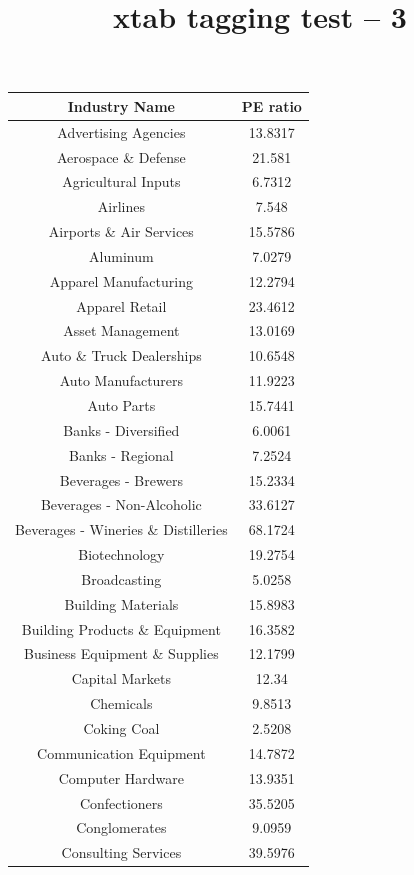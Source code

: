 \documentclass{article}
\title{xtab tagging test -- 3}
\begin{document}
\begin{xtabular}{cc}
Industry Name & PE ratio \\ \hline
Advertising Agencies & 13.8317\\\hline
Aerospace \& Defense & 21.581 \\ \hline
Agricultural Inputs & 6.7312 \\ \hline
Airlines & 7.548 \\ \hline
Airports \& Air Services & 15.5786 \\ \hline
Aluminum & 7.0279 \\ \hline
Apparel Manufacturing & 12.2794\\ \hline
Apparel Retail & 23.4612 \\ \hline
Asset Management& 13.0169\\ \hline
Auto \& Truck Dealerships& 10.6548\\ \hline
Auto Manufacturers& 11.9223\\ \hline
Auto Parts& 15.7441 \\ \hline
Banks - Diversified& 6.0061\\ \hline
Banks - Regional& 7.2524\\ \hline
Beverages - Brewers& 15.2334 \\ \hline
Beverages - Non-Alcoholic & 33.6127\\ \hline
Beverages - Wineries \& Distilleries & 68.1724\\ \hline
Biotechnology & 19.2754\\ \hline
Broadcasting & 5.0258\\ \hline
Building Materials & 15.8983\\ \hline
Building Products \& Equipment & 16.3582\\ \hline
Business Equipment \& Supplies & 12.1799\\ \hline
Capital Markets & 12.34\\ \hline
Chemicals & 9.8513\\ \hline
Coking Coal & 2.5208\\ \hline
Communication Equipment & 14.7872\\ \hline
Computer Hardware & 13.9351\\ \hline
Confectioners & 35.5205\\ \hline
Conglomerates & 9.0959\\ \hline
Consulting Services & 39.5976\\ \hline

\end{xtabular}
\end{document}
